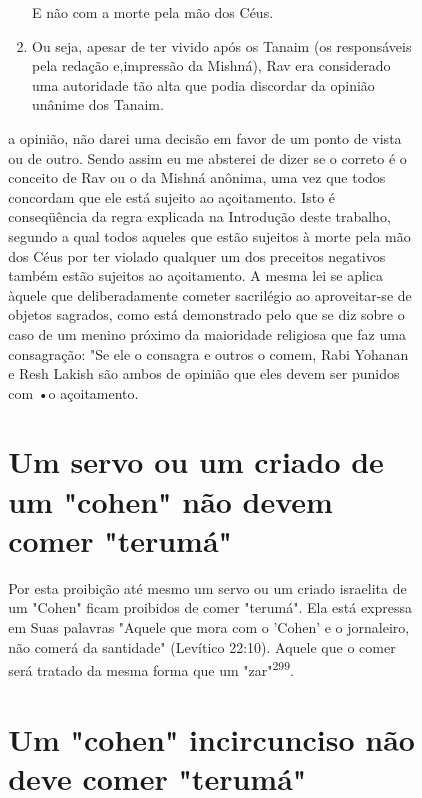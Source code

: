 \begin{itemize}
\begin{enumrate}
\begin{itemize}
\begin{itemize}
\begin{itemize}
\begin{enumerate}
 E não com a morte pela mão dos Céus.
 
\item
 
 Ou seja, apesar de ter vivido após os Tanaim (os responsáveis pela
 redação e,impressão da Mishná), Rav era considerado uma autoridade tão
 alta que podia discordar da opinião unânime dos Tanaim.
 
\end{enumerate}


a opinião, não darei uma decisão em favor de um ponto de vista ou de
outro. Sendo assim eu me absterei de dizer se o correto é o conceito de
Rav ou o da Mishná anônima, uma vez que todos concordam que ele está
sujeito ao açoita­mento. Isto é conseqüência da regra explicada na
Introdução deste trabalho, segundo a qual todos aqueles que estão
sujeitos à morte pela mão dos Céus por ter violado qualquer um dos
preceitos negativos também estão sujeitos ao açoitamento. A mesma lei se
aplica àquele que deliberadamente cometer sacri­légio ao aproveitar-se
de objetos sagrados, como está demonstrado pelo que se diz sobre o caso
de um menino próximo da maioridade religiosa que faz uma consagração:
"Se ele o consagra e outros o comem, Rabi Yohanan e Resh La­kish são
ambos de opinião que eles devem ser punidos com •o açoitamento.

\section{Um servo ou um criado de um "cohen" não devem comer "terumá"}

Por esta proibição até mesmo um servo ou um criado israelita de um
"Cohen" ficam proibidos de comer "terumá". Ela está expressa em Suas
pala­vras "Aquele que mora com o 'Cohen' e o jornaleiro, não comerá da
santida­de" (Levítico 22:10). Aquele que o comer será tratado da mesma
forma que um "zar"\textsuperscript{299}.

\section{Um "cohen" incircunciso não deve comer "terumá"}


\end{itemize}
\end{itemize}
\end{itemize}
\end{enumrate}
\end{itemize}
